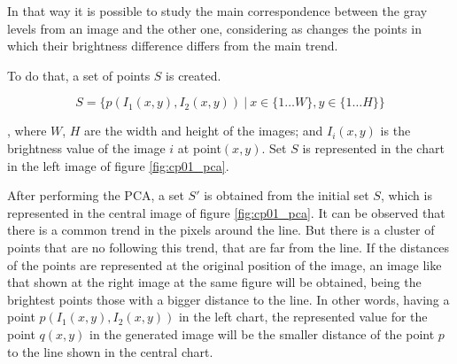 In that way it is possible to study the main correspondence between the gray levels from an image and the other one, considering as changes the points in which their brightness difference differs from the main trend.

To do that, a set of points $S$ is created.

\begin{equation}\label{eq:cp01_brightness_relation}
S = \{ p(I_1(x, y), I_2(x,y)) ~|~ x \in \{1 \dots W\}, y \in \{1 \dots H\} \}
\end{equation}

, where $W$, $H$ are the width and height of the images; and $I_i(x, y)$ is the brightness value of the image $i$ at point$(x,y)$. Set $S$ is represented in the chart in the left image of figure \ref{fig:cp01_pca}.

After performing the \ac{PCA}, a set $S'$ is obtained from the initial set $S$, which is represented in the central image of figure \ref{fig:cp01_pca}. It can be observed that there is a common trend in the pixels around the line. But there is a cluster of points that are no following this trend, that are far from the line. If the distances of the points are represented at the original position of the image, an image like that shown at the right image at the same figure will be obtained, being the brightest points those with a bigger distance to the line. In other words, having a point $p(I_1(x, y), I_2(x, y))$ in the left chart, the represented value for the point $q(x, y)$ in the generated image will be the smaller distance of the point $p$ to the line shown in the central chart.

